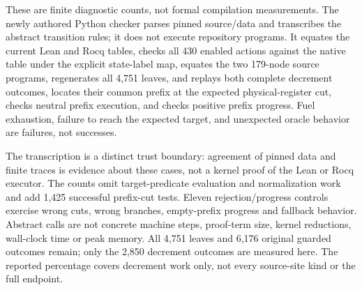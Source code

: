 These are finite diagnostic counts, not formal compilation measurements. The newly authored Python checker parses pinned source/data and transcribes the abstract transition rules; it does not execute repository programs. It equates the current Lean and Rocq tables, checks all 430 enabled actions against the native table under the explicit state-label map, equates the two 179-node source programs, regenerates all 4,751 leaves, and replays both complete decrement outcomes, locates their common prefix at the expected physical-register cut, checks neutral prefix execution, and checks positive prefix progress. Fuel exhaustion, failure to reach the expected target, and unexpected oracle behavior are failures, not successes.

The transcription is a distinct trust boundary: agreement of pinned data and finite traces is evidence about these cases, not a kernel proof of the Lean or Rocq executor. The counts omit target-predicate evaluation and normalization work and add 1,425 successful prefix-cut tests. Eleven rejection/progress controls exercise wrong cuts, wrong branches, empty-prefix progress and fallback behavior. Abstract calls are not concrete machine steps, proof-term size, kernel reductions, wall-clock time or peak memory. All 4,751 leaves and 6,176 original guarded outcomes remain; only the 2,850 decrement outcomes are measured here. The reported percentage covers decrement work only, not every source-site kind or the full endpoint.
